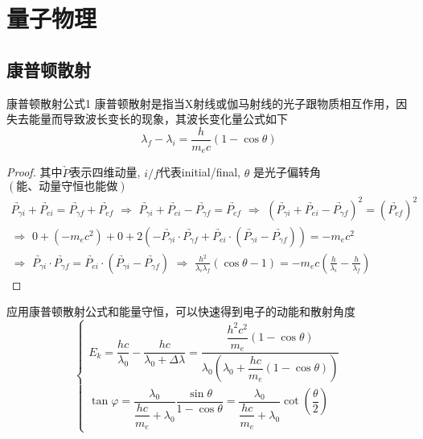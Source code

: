 
\chapter{量子物理}
\label{chap3}
\section{康普顿散射}
\begin{myprop}{康普顿散射公式}{1}
	 康普顿散射是指当X射线或伽马射线的光子跟物质相互作用，因失去能量而导致波长变长的现象，其波长变化量公式如下
	\[
		\lambda_f-\lambda_i=\frac{h}{m_e c}(1-\cos \theta)	
	\]
\end{myprop}
\begin{proof}
	其中$\underrightarrow{P}$表示四维动量, $i/f$代表initial/final, $\theta$ 是光子偏转角$\left( \text{能、动量守恒也能做} \right)$ 
	\[
		\begin{gathered}
		\underrightarrow{P_{\gamma i}}+\underrightarrow{P_{ei}}=\underrightarrow{P_{\gamma f}}+\underrightarrow{P_{ef}}\,\,   \Rightarrow \,\,   \underrightarrow{P_{\gamma i}}+\underrightarrow{P_{ei}}-\underrightarrow{P_{\gamma f}}=\underrightarrow{P_{ef}}\,\,   \Rightarrow \,\,   (\underrightarrow{P_{\gamma i}}+\underrightarrow{P_{ei}}-\underrightarrow{P_{\gamma f}})^2=(\underrightarrow{P_{ef}})^2
		\\
		\Rightarrow \,\,   0+\left( -m_ec^2 \right) +0+2\left( -\underrightarrow{P_{\gamma i}}\cdot \underrightarrow{P_{\gamma f}}+\underrightarrow{P_{ei}}\cdot \left( \underrightarrow{P_{\gamma i}}-\underrightarrow{P_{\gamma f}} \right) \right) =-m_ec^2
		\\
		\Rightarrow \,\,   \underrightarrow{P_{\gamma i}}\cdot \underrightarrow{P_{\gamma f}}=\underrightarrow{P_{ei}}\cdot \left( \underrightarrow{P_{\gamma i}}-\underrightarrow{P_{\gamma f}} \right) \,\,  \Rightarrow \,\,   \frac{h^2}{\lambda _i\lambda _f}\left( \cos \theta -1 \right) =-m_ec\left( \frac{h}{\lambda _i}-\frac{h}{\lambda _f} \right) 	
		\end{gathered}
	\]	
\end{proof}

\begin{remark}
	应用康普顿散射公式和能量守恒，可以快速得到电子的动能和散射角度
	\[
		\begin{cases}
			E_{k}=\dfrac{hc}{\lambda_0}-\dfrac{hc}{\lambda_0+\Delta\lambda}=\dfrac{\dfrac{h^2c^2}{m_e}(1-\cos \theta)}{\lambda_0(\lambda_0+\dfrac{hc}{m_e}(1-\cos \theta))}\\
			\tan \varphi = \dfrac{\lambda_0}{\dfrac{hc}{m_e}+\lambda_0}\dfrac{\sin \theta}{1-\cos \theta}=\dfrac{\lambda_0}{\dfrac{hc}{m_e}+\lambda_0}\cot \left(\dfrac{\theta}{2}\right)
		\end{cases}
	\]
\end{remark}


